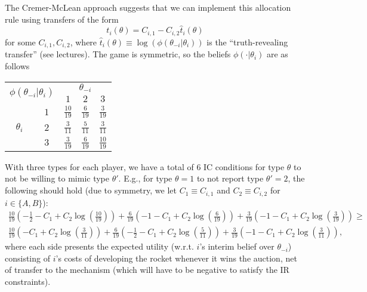 \documentclass[a4paper]{article}
\begin{document}
The Cremer-McLean approach suggests that we can implement this allocation rule using transfers of the form 
$$t_i(\theta) = C_{i,1} - C_{i,2} \hat{t}_i(\theta)$$ 
for some $C_{i,1}, C_{i,2}$, where $\hat{t}_i(\theta) \equiv \log \left( \phi(\theta_{-i} | \theta_i) \right) $ is the ``truth-revealing transfer'' (see lectures).
The game is symmetric, so the beliefs $\phi(\cdot|\theta_i)$ are as follows
\begin{center}
	\begin{tabular}{c  c | c | c | c |}
		\multicolumn{2}{c}{\multirow{2}{*}{$\phi(\theta_{-i}|\theta_i)$}} & \multicolumn{3}{c}{$\theta_{-i}$} \\
		&& $1$ 				& $2$	& $3$				\\ \hline
		\multirow{3}{*}{$\theta_i$} &
		$1$	& $\frac{10}{19}$	& $\frac{6}{19}$	& $\frac{3}{19}$	\\ \hline
		&$2$	& $\frac{3}{11}$& $\frac{5}{11}$		& $\frac{3}{11}$	\\ \hline
		&$3$	& $\frac{3}{19}$& $\frac{6}{19}$	& $\frac{10}{19}$		\\ \hline
	\end{tabular}
\end{center}
With three types for each player, we have a total of 6 IC conditions for type $\theta$ to not be willing to mimic type $\theta'$. E.g., for type $\theta=1$ to not report type $\theta'=2$, the following should hold (due to symmetry, we let $C_1 \equiv C_{i,1}$ and $C_2 \equiv C_{i,2}$ for $i \in \{A,B\}$):
\begin{align*}
	\frac{10}{19}\left( -\frac{1}{2} - C_{1} + C_{2} \log \left( \frac{10}{19} \right) \right) 
	+ \frac{6}{19}\left( -1 - C_{1} + C_{2} \log \left( \frac{6}{19} \right) \right) 
	+ \frac{3}{19}\left( -1 - C_{1} + C_{2} \log \left( \frac{3}{19} \right) \right)
	\geq 
	\\
	\frac{10}{19}\left( - C_{1} + C_{2} \log \left( \frac{3}{11} \right) \right)
	+ \frac{6}{19}\left( -\frac{1}{2} - C_{1} + C_{2} \log \left( \frac{5}{11} \right) \right)
	+ \frac{3}{19}\left( -1 - C_{1} + C_{2} \log \left( \frac{3}{11} \right) \right),
\end{align*}
where each side presents the expected utility (w.r.t. $i$'s interim belief over $\theta_{-i}$) consisting of $i$'s costs of developing the rocket whenever it wins the auction, net of transfer to the mechanism (which will have to be negative to satisfy the IR constraints).
\end{document}
